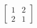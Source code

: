 \documentclass[preview]{standalone}
\begin{document}
\begin{align*}
\left[\begin{matrix}1 & 2\\2 & 1\end{matrix}\right]
\end{align*}
\end{document}
